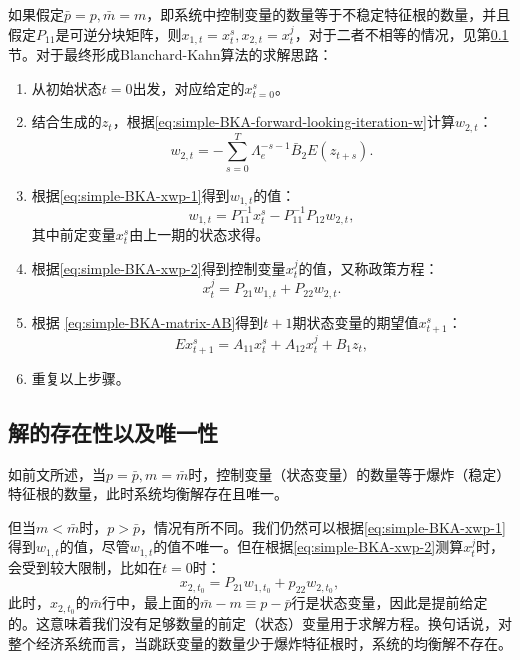 如果假定$\bar{p}=p, \bar{m}=m$，即系统中控制变量的数量等于不稳定特征根的数量，并且假定$P_{11}$是可逆分块矩阵，则$x_{1,t}=x_t^s, x_{2,t}=x_t^j$，对于二者不相等的情况，见第\ref{sec:simple-BKA-exist-unique}节。对于最终形成Blanchard-Kahn算法的求解思路：
\begin{enumerate}
\item 从初始状态$t=0$出发，对应给定的$x_{t=0}^s$。
\item 结合生成的$z_t$，根据\eqref{eq:simple-BKA-forward-looking-iteration-w}计算$w_{2,t}$：
\begin{equation*}
  w_{2,t} = - \sum_{s=0}^{T} \Lambda_{e}^{-s-1} \bar{B}_2 E(z_{t+s}).
\end{equation*}

\item 根据\eqref{eq:simple-BKA-xwp-1}得到$w_{1,t}$的值：
\begin{equation*}
  w_{1,t} = P_{11}^{-1} x_{t}^s - P_{11}^{-1} P_{12} w_{2,t},
\end{equation*}
其中前定变量$x_t^s$由上一期的状态求得。

\item 根据\eqref{eq:simple-BKA-xwp-2}得到控制变量$x_{t}^j$的值，又称政策方程：
\begin{equation*}
  x_t^j = P_{21} w_{1,t} + P_{22} w_{2,t}.
\end{equation*}

\item 根据 \eqref{eq:simple-BKA-matrix-AB}得到$t+1$期状态变量的期望值$x_{t+1}^s$：
\begin{equation*}
  E x_{t+1}^s = A_{11} x_{t}^s + A_{12} x_{t}^j + B_1 z_t,
\end{equation*}

\item 重复以上步骤。
\end{enumerate}

\subsection{解的存在性以及唯一性}
\label{sec:simple-BKA-exist-unique}
如前文所述，当$p=\bar{p},m=\bar{m}$时，控制变量（状态变量）的数量等于爆炸（稳定）特征根的数量，此时系统均衡解存在且唯一。

但当$m<\bar{m}$时，$p>\bar{p}$，情况有所不同。我们仍然可以根据\eqref{eq:simple-BKA-xwp-1}得到$w_{1,t}$的值，尽管$w_{1,t}$的值不唯一。但在根据\eqref{eq:simple-BKA-xwp-2}测算$x_{t}^j$时，会受到较大限制，比如在$t=0$时：
\begin{equation*}
x_{2,t_0} = P_{21} w_{1,t_0} + p_{22} w_{2,t_0},
\end{equation*}
此时，$x_{2,t_0}$的$\bar{m}$行中，最上面的$\bar{m} - m \equiv p - \bar{p}$行是状态变量，因此是提前给定的。这意味着我们没有足够数量的前定（状态）变量用于求解方程。换句话说，对整个经济系统而言，当跳跃变量的数量少于爆炸特征根时，系统的均衡解不存在。

